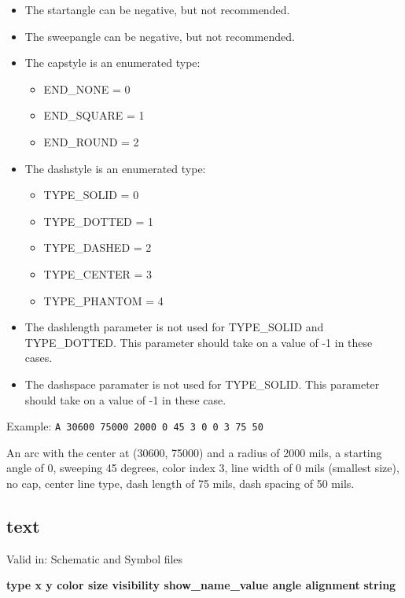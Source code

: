 \documentclass{article}
\begin{document}
\begin{itemize}
\item The startangle can be negative, but not recommended.
\item The sweepangle can be negative, but not recommended.
\item The capstyle is an enumerated type: 
\begin{itemize}
	\item END\_NONE = 0
	\item END\_SQUARE = 1
	\item END\_ROUND = 2
\end{itemize}
\item The dashstyle is an enumerated type: 
\begin{itemize}
	\item TYPE\_SOLID = 0 
	\item TYPE\_DOTTED = 1
	\item TYPE\_DASHED = 2
	\item TYPE\_CENTER = 3
        \item TYPE\_PHANTOM = 4
\end{itemize}
\item The dashlength parameter is not used for TYPE\_SOLID and TYPE\_DOTTED.  
      This parameter should take on a value of -1 in these cases.
\item The dashspace paramater is not used for TYPE\_SOLID.
      This parameter should take on a value of -1 in these case.
\end{itemize}

Example:\newline
{\tt A 30600 75000 2000 0 45 3 0 0 3 75 50}

An arc with the center at (30600, 75000) and a radius of 2000 mils, a 
starting angle of 0, sweeping 45 degrees, color index 3, line width of 0 mils 
(smallest size), no cap, center line type, dash length of 75 mils, dash 
spacing of 50 mils.


\subsection{text}

Valid in: Schematic and Symbol files

{\bf type x y color size visibility show\_name\_value angle alignment}\newline
{\bf string}
\end{document}
